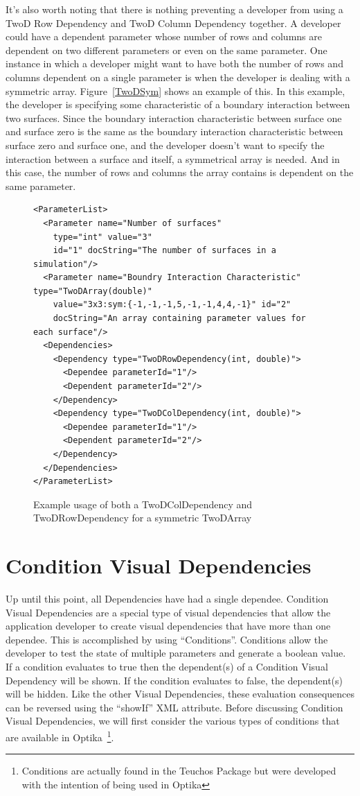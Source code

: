 It's also worth noting that there is nothing preventing a developer from using a TwoD Row Dependency and TwoD Column Dependency together. 
A developer could have a 
dependent parameter whose number of rows and columns are dependent on two different parameters or even on the same parameter. One instance in which a
developer
might want to have both the number of rows and columns dependent on a single parameter is when the developer is dealing with a symmetric array. 
Figure~\ref{TwoDSym}
shows an example of this. In this example, the developer is specifying some characteristic of a boundary interaction between two surfaces. Since the boundary
interaction characteristic between surface one and surface zero is the same as the boundary interaction characteristic between surface zero and surface one,
and the developer doesn't want to specify the interaction between a surface and itself, a symmetrical array is needed. And in this case, the number of rows 
and columns the array contains is dependent on the same parameter.

\begin{figure}
\centering
{\footnotesize
\begin{Verbatim}
<ParameterList>
  <Parameter name="Number of surfaces" 
    type="int" value="3"
    id="1" docString="The number of surfaces in a simulation"/>
  <Parameter name="Boundry Interaction Characteristic" type="TwoDArray(double)"
    value="3x3:sym:{-1,-1,-1,5,-1,-1,4,4,-1}" id="2" 
    docString="An array containing parameter values for each surface"/>
  <Dependencies>
    <Dependency type="TwoDRowDependency(int, double)">
      <Dependee parameterId="1"/>
      <Dependent parameterId="2"/>
    </Dependency>
    <Dependency type="TwoDColDependency(int, double)">
      <Dependee parameterId="1"/>
      <Dependent parameterId="2"/>
    </Dependency>
  </Dependencies>
</ParameterList>
\end{Verbatim}
}
\caption{Example usage of both a TwoDColDependency and TwoDRowDependency for a symmetric TwoDArray}
\label{TwoDColXML}
\end{figure}

\section{Condition Visual Dependencies}
Up until this point, all Dependencies have had a single dependee. Condition Visual Dependencies are a special type of visual dependencies 
that allow the application developer to create visual dependencies that have more than one dependee. This is accomplished by using 
``Conditions''. Conditions allow the developer to test the state of multiple parameters and generate a boolean value. 
If a condition evaluates to true then the dependent(s) of a Condition Visual Dependency will be shown. If the condition evaluates to 
false, the dependent(s) will be hidden. Like the other Visual Dependencies, these evaluation consequences can be reversed using the 
``showIf'' XML attribute.  Before discussing 
Condition Visual Dependencies, we will first consider the various types of conditions that are available in Optika~\footnote{Conditions are actually found in the Teuchos Package 
but were developed with the intention of being used in Optika}.

